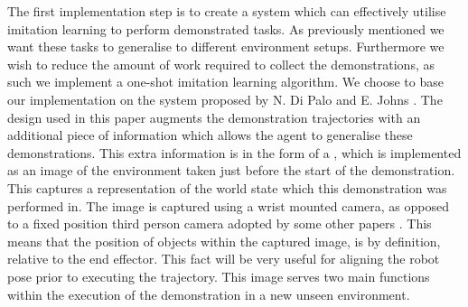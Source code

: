 The first implementation step is to create a system which can effectively utilise imitation learning to perform demonstrated tasks. As previously mentioned we want these tasks to generalise to different environment setups. Furthermore we wish to reduce the amount of work required to collect the demonstrations, as such we implement a one-shot imitation learning algorithm. We choose to base our implementation on the  system proposed by N. Di Palo and E. Johns \cite{one-shot-imitation}. The design used in this paper augments the demonstration trajectories with an additional piece of information which allows the agent to generalise these demonstrations. This extra information is in the form of a , which is implemented as an image of the environment taken just before the start of the demonstration. This captures a representation of the world state which this demonstration was performed in. The image is captured using a wrist mounted camera, as opposed to a fixed position third person camera adopted by some other papers \cite{one-shot-pose-estimate}. This means that the position of objects within the captured image, is by definition, relative to the end effector. This fact will be very useful for aligning the robot pose prior to executing the trajectory.
This image serves two main functions within the execution of the demonstration in a new unseen environment.

